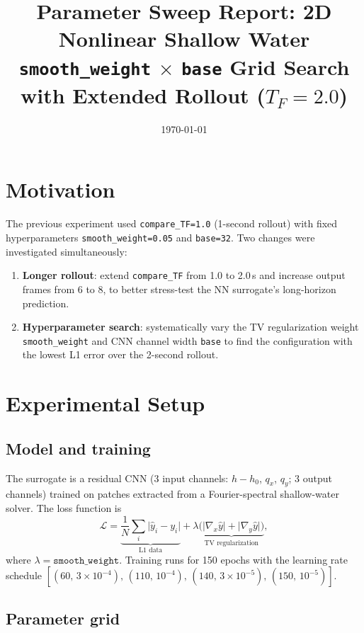 \documentclass[11pt,a4paper]{article}
\title{Parameter Sweep Report: 2D Nonlinear Shallow Water\\
\large \texttt{smooth\_weight} $\times$ \texttt{base} Grid Search with Extended Rollout ($T_F = 2.0$)}
\author{}
\date{\today}
\begin{document}
\maketitle

\section{Motivation}

The previous experiment used \texttt{compare\_TF=1.0} (1-second rollout) with fixed hyperparameters
\texttt{smooth\_weight=0.05} and \texttt{base=32}.
Two changes were investigated simultaneously:
\begin{enumerate}
  \item \textbf{Longer rollout}: extend \texttt{compare\_TF} from 1.0 to 2.0\,s and increase output frames from 6 to 8, to better stress-test the NN surrogate's long-horizon prediction.
  \item \textbf{Hyperparameter search}: systematically vary the TV regularization weight \texttt{smooth\_weight} and CNN channel width \texttt{base} to find the configuration with the lowest L1 error over the 2-second rollout.
\end{enumerate}

\section{Experimental Setup}

\subsection{Model and training}

The surrogate is a residual CNN (3 input channels: $h - h_0$, $q_x$, $q_y$; 3 output channels) trained on
patches extracted from a Fourier-spectral shallow-water solver.
The loss function is
\begin{equation}
  \mathcal{L} = \underbrace{\frac{1}{N}\sum_i \lvert \hat{y}_i - y_i \rvert}_{\text{L1 data}}
  + \lambda \underbrace{\bigl(\lvert \nabla_x \hat{y}\rvert + \lvert \nabla_y \hat{y}\rvert\bigr)}_{\text{TV regularization}},
\end{equation}
where $\lambda = \texttt{smooth\_weight}$.
Training runs for 150 epochs with the learning rate schedule
$[(60,\,3\times10^{-4}),\,(110,\,10^{-4}),\,(140,\,3\times10^{-5}),\,(150,\,10^{-5})]$.

\subsection{Parameter grid}
\end{document}

